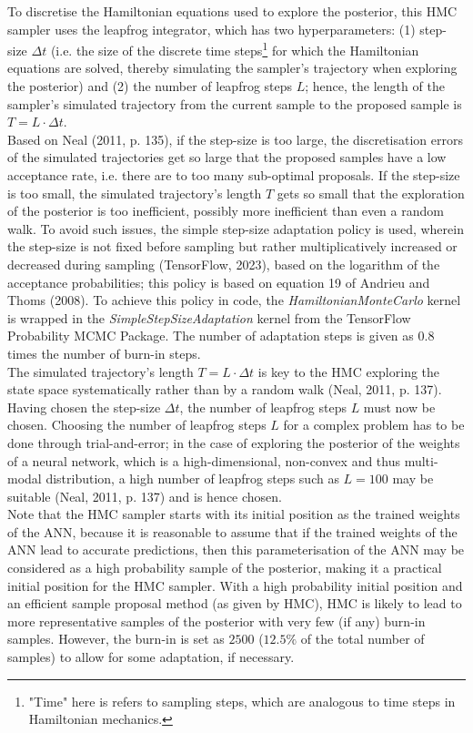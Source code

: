 \documentclass[conference]{IEEEtran}
\begin{document}
To discretise the Hamiltonian equations used to explore the posterior, this HMC sampler uses the leapfrog integrator, which has two hyperparameters: (1) step-size $\Delta t$ (i.e. the size of the discrete time steps\footnote{"Time" here is refers to sampling steps, which are analogous to time steps in Hamiltonian mechanics.} for which the Hamiltonian equations are solved, thereby simulating the sampler's trajectory when exploring the posterior) and (2) the number of leapfrog steps $L$; hence, the length of the sampler's simulated trajectory from the current sample to the proposed sample is $T = L \cdot \Delta t$.\\

Based on Neal (2011, p. 135), if the step-size is too large, the discretisation errors of the simulated trajectories get so large that the proposed samples have a low acceptance rate, i.e. there are to too many sub-optimal proposals. If the step-size is too small, the simulated trajectory's length $T$ gets so small that the exploration of the posterior is too inefficient, possibly more inefficient than even a random walk. To avoid such issues, the simple step-size adaptation policy is used, wherein the step-size is not fixed before sampling but rather multiplicatively increased or decreased during sampling (TensorFlow, 2023), based on the logarithm of the acceptance probabilities; this policy is based on equation 19 of Andrieu and Thoms (2008). To achieve this policy in code, the \textit{HamiltonianMonteCarlo} kernel is wrapped in the \textit{SimpleStepSizeAdaptation} kernel from the TensorFlow Probability MCMC Package. The number of adaptation steps is given as 0.8 times the number of burn-in steps.\\

The simulated trajectory's length $T = L \cdot \Delta t$ is key to the HMC exploring the state space systematically rather than by a random walk (Neal, 2011, p. 137). Having chosen the step-size $\Delta t$, the number of leapfrog steps $L$ must now be chosen. Choosing the number of leapfrog steps $L$ for a complex problem has to be done through trial-and-error; in the case of exploring the posterior of the weights of a neural network, which is a high-dimensional, non-convex and thus multi-modal distribution, a high number of leapfrog steps such as $L = 100$ may be suitable (Neal, 2011, p. 137) and is hence chosen.\\

Note that the HMC sampler starts with its initial position as the trained weights of the ANN, because it is reasonable to assume that if the trained weights of the ANN lead to accurate predictions, then this parameterisation of the ANN may be considered as a high probability sample of the posterior, making it a practical initial position for the HMC sampler. With a high probability initial position and an efficient sample proposal method (as given by HMC), HMC is likely to lead to more representative samples  of the posterior with very few (if any) burn-in samples. However, the burn-in is set as $2500$ ($12.5\%$ of the total number of samples) to allow for some adaptation, if necessary.
\end{document}
